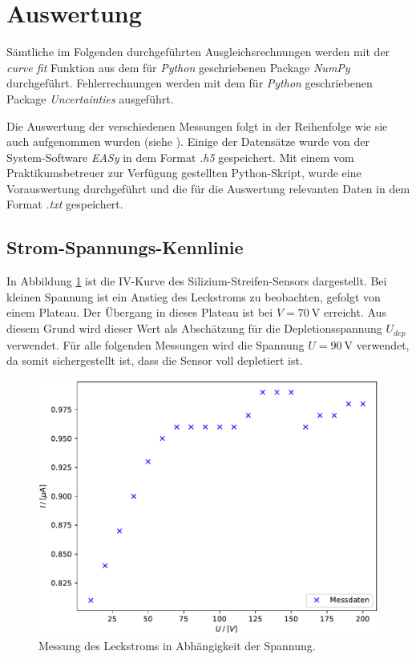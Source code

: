 \section{Auswertung}
\label{sec:Auswertung}
Sämtliche im Folgenden durchgeführten Ausgleichsrechnungen werden mit der \emph{curve fit} Funktion aus dem für \emph{Python} geschriebenen Package \emph{NumPy}\cite{scipy} durchgeführt. Fehlerrechnungen werden mit dem für \emph{Python} geschriebenen Package \emph{Uncertainties}\cite{uncertainties} ausgeführt.

Die Auswertung der verschiedenen Messungen folgt in der Reihenfolge wie sie auch aufgenommen wurden (siehe \cite{skript}). Einige der Datensätze wurde von der System-Software \emph{EASy} in dem Format \emph{.h5} gespeichert. Mit einem vom Praktikumsbetreuer zur Verfügung gestellten Python-Skript, wurde eine Vorauswertung durchgeführt und die für die Auswertung relevanten Daten in dem Format \emph{.txt} gespeichert.

\subsection{Strom-Spannungs-Kennlinie}
\label{sec:IV}
In Abbildung \ref{fig:IV} ist die IV-Kurve des Silizium-Streifen-Sensors dargestellt. Bei kleinen Spannung ist ein Anstieg des Leckstroms zu beobachten, gefolgt von einem Plateau. Der Übergang in dieses Plateau ist bei $V=\SI{70}{\volt}$ erreicht. Aus diesem Grund wird dieser Wert als Abschätzung für die Depletionsspannung $U_{dep}$ verwendet. Für alle folgenden Messungen wird die Spannung $U=\SI{90}{\volt}$ verwendet, da somit sichergestellt ist, dass die Sensor voll depletiert ist.

\begin{figure}[H]
  \centering
  \includegraphics{build/IV_Kurve.pdf}
  \caption{Messung des Leckstroms in Abhängigkeit der Spannung.}
  \label{fig:IV}
\end{figure}

